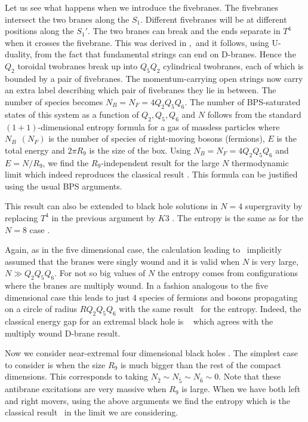 Let us see what happens when we introduce the
fivebranes. The fivebranes intersect the 
two branes along the $S_1$. Different fivebranes
will be at different positions along the $S_1'$. 
The two branes can break and the ends separate in 
$T^4$ when it crosses the fivebrane. This was 
derived in %
\asop ,\twn\  and it follows, using
U-duality, from the fact that fundamental strings can end
on D-branes. 
Hence the $Q_2$ toroidal twobranes break
up into $Q_5 Q_2$
cylindrical twobranes, each of which is bounded by a pair of fivebranes. The
momentum-carrying open strings now carry an extra label describing which 
pair
 of
fivebranes
they lie in between. The number of species becomes $N_B=N_F=4Q_2Q_5Q_6$.
 The number of BPS-saturated states
of this system as a function of $Q_2,Q_5 ,Q_6$ and $N$ 
follows from the standard
$(1+1)$-dimensional entropy formula for a gas of massless particles
\eqn{}
where $N_B~~(N_F)$ 
is the number of species of right-moving bosons (fermions),
$E$ is the total energy and $2 \pi R_9$ 
is the size of the box. Using $ N_B = N_F =  4 Q_2 Q_5 Q_6 $
and $E=N/R_9$, we find the $R_9$-independent result for the large $N$
thermodynamic
limit 
\eqn{}
which indeed reproduces the classical result \entrofe .
This formula can be  justified using the usual BPS arguments.


This result can also be extended to black hole solutions
in $N=4$ supergravity by replacing $T^4$ in the previous
argument by $K3$ \sm . The entropy is the same as for the
$N=8$ case \setn .

Again, as in the five dimensional case, the calculation
leading to \setn\ implicitly assumed that the branes were 
singly wound  and it is  valid when $N$ is very large,
$N \gg Q_2 Q_5 Q_6$. 
For not so big values of $N$ the entropy comes from 
configurations where the branes are multiply wound.
In a fashion analogous to the five dimensional case this
leads to just 4 species of fermions and bosons propagating
on a circle of radius $ R Q_2 Q_5 Q_6 $ with the same result
\setn\ for the entropy.
Indeed, the classical energy gap for an extremal black hole
is \limitations\ 
\eqn{}
which agrees with the multiply wound D-brane result. 

Now we consider near-extremal four dimensional black holes \hlm .
The simplest case to consider is when 
the size $R_9$ is much bigger than the rest of the
compact dimensions. This corresponds to taking
$ N_{\bar 2} \sim  N_{\bar 5} \sim
N_{\bar 6} \sim 0 $. Note that these antibrane
excitations are very massive when
$R_9$ is large.
When we have both left and right movers, using the
above arguments we find the entropy
\eqn{}
which is the classical result \entropyb\ in the limit
we are considering. 


